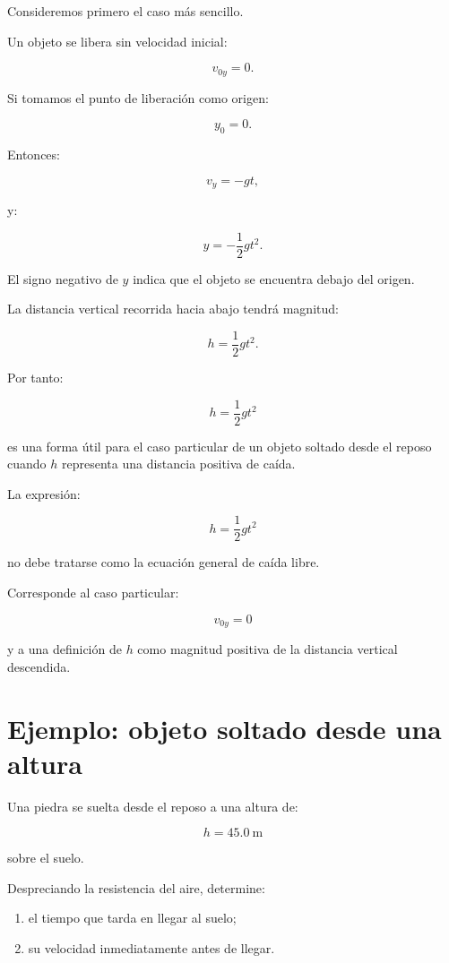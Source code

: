 Consideremos primero el caso más sencillo.

Un objeto se libera sin velocidad inicial:

\[ v_{0y}=0. \]

Si tomamos el punto de liberación como origen:

\[ y_0=0. \]

Entonces:

\[ v_y=-gt, \]

y:

\[ y=-\frac{1}{2}gt^2. \]

El signo negativo de \(y\) indica que el objeto se encuentra debajo del origen.

La distancia vertical recorrida hacia abajo tendrá magnitud:

\[ h=\frac{1}{2}gt^2. \]

Por tanto:

\[ \boxed{h=\frac{1}{2}gt^2} \]

es una forma útil para el caso particular de un objeto soltado desde el reposo cuando \(h\) representa una distancia positiva de caída.

\begin{advertencia}
La expresión:

\[ h=\frac{1}{2}gt^2 \]

no debe tratarse como la ecuación general de caída libre.

Corresponde al caso particular:

\[
v_{0y}=0
\]

y a una definición de \(h\) como magnitud positiva de la distancia vertical descendida.
\end{advertencia}


\section{Ejemplo: objeto soltado desde una altura}

\begin{ejemplo}
Una piedra se suelta desde el reposo a una altura de:

\[ h=\SI{45.0}{\meter} \]

sobre el suelo.

Despreciando la resistencia del aire, determine:

\begin{enumerate}[label=\alph*)]
    \item el tiempo que tarda en llegar al suelo;
    \item su velocidad inmediatamente antes de llegar.
\end{enumerate}
\end{ejemplo}


